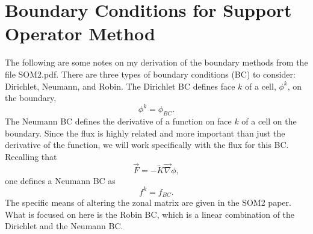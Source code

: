 \documentclass[11pt,letterpaper,oneside,notitlepage]{article}	%
\newcommand{\tensor}{\overleftrightarrow}		%
\newcommand{\del}{\vec\nabla}				%
\newcommand{\pindent}[1]{\hspace{6mm}}  		%
\begin{document}

\section{Boundary Conditions for Support Operator Method}%
\pindent{}The following are some notes on my derivation of the boundary methods from the file SOM2.pdf.  There are three types of boundary conditions (BC) to consider: Dirichlet, Neumann, and Robin. The Dirichlet BC defines face $k$ of a cell, $\phi^k$, on the boundary,
\begin{equation}
\phi^k=\phi_{BC}	\label{dirichlet}
.\end{equation}
The Neumann BC defines the derivative of a function on face $k$ of a cell on the boundary. Since the flux is highly related and more important than just the derivative of the function, we will work specifically with the flux for this BC. Recalling that 
\begin{equation} 
\vec F = -\tensor K\del\phi		\label{flux}
,\end{equation}
one defines a Neumann BC as
\begin{equation}
f^k = f_{BC}	\label{neumann}
.\end{equation}
The specific means of altering the zonal matrix are given in the SOM2 paper.  What is focused on here is the Robin BC, which is a linear combination of the Dirichlet and the Neumann BC. 
\end{document}
